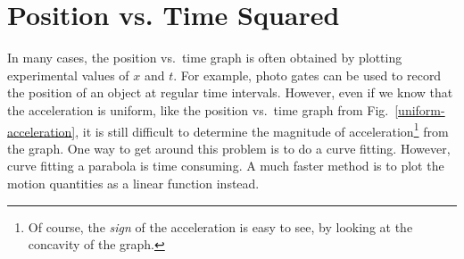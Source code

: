 \documentclass{../../oss-handout}
\begin{document}
\section{Position vs. Time Squared}
In many cases, the position vs.\ time graph is often obtained by plotting
experimental values of $x$ and $t$. For example, photo gates can be used to
record the position of an object at regular time intervals. However, even if we
know that the acceleration is uniform, like the position vs.\ time graph
from Fig.~\ref{uniform-acceleration}, it is still difficult to determine the
magnitude of acceleration\footnote{Of course, the \emph{sign} of the
  acceleration is easy to see, by looking at the concavity of the graph.} from
the graph. One way to get around this problem is to do a curve fitting.
However, curve fitting a parabola is time consuming. A much faster method is to
plot the motion quantities as a linear function instead.
%
\end{document}
